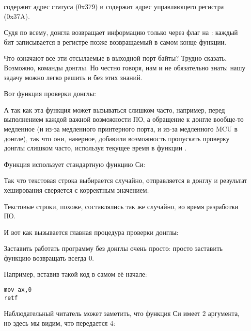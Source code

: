  содержит адрес статуса (0x379) и 
 содержит адрес управляющего регистра (0x37A).

Судя по всему, донгла возвращает информацию только через флаг  на : 
каждый бит записывается в регистре  позже возвращаемый в самом конце функции.

Что означают все эти отсылаемые в выходной порт байты?
Трудно сказать. Возможно, команды донглы.
Но честно говоря, нам и не обязательно знать: нашу задачу можно легко решить и без этих знаний.

Вот функция проверки донглы:



А так как эта функция может вызываться слишком часто, например, 
перед выполнением каждой важной возможности ПО,
а обращение к донгле вообще-то медленное (и из-за медленного принтерного порта, и из-за медленного
\ac{MCU} в донгле), так что они, наверное, добавили возможность пропускать проверку донглы слишком часто,
используя текущее время в функции .

Функция  использует стандартную функцию Си:



Так что текстовая строка выбирается случайно, отправляется в донглу и результат
хеширования сверяется с корректным значением.

Текстовые строки, похоже, составлялись так же случайно, во время разработки ПО.

И вот как вызывается главная процедура проверки донглы:



Заставить работать программу без донглы очень просто: просто заставить функцию
 возвращать всегда 0.

Например, вставив такой код в самом её начале:

\begin{lstlisting}[style=customasmx86]
mov ax,0
retf
\end{lstlisting}

Наблюдательный читатель может заметить, что функция Си  имеет 2 аргумента, но здесь
мы видим, что передается 4:



